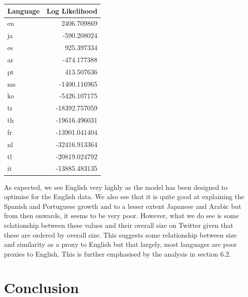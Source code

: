 \documentclass[12pt]{article}
\begin{document}
\begin{table}[hbtp]
\begin{center}
\begin{tabular}{lr}
\toprule
 Language &  Log Likelihood \\
\midrule
       en &     2406.709869 \\
       ja &     -590.208024 \\
       es &      925.397334 \\
       ar &     -474.177388 \\
       pt &      413.507636 \\
       ms &    -1400.116965 \\
       ko &    -5426.107175 \\
       tr &   -18392.757059 \\
       th &   -19616.496031 \\
       fr &   -13901.041404 \\
       nl &   -32416.913364 \\
       tl &   -20819.024792 \\
       it &   -13885.483135 \\
\bottomrule
\end{tabular}
\end{center}
\end{table}
\FloatBarrier
\vspace{0.5cm}
As expected, we see English very highly as the model has been designed to optimise for the English data. We also see that it is quite good at explaining the Spanish and Portuguese growth and to a lesser extent Japanese and Arabic but from then onwards, it seems to be very poor. However, what we do see is some relationship between these values and their overall size on Twitter given that these are ordered by overall size. This suggests some relationship between size and similarity as a proxy to English but that largely, most languages are poor proxies to English. This is further emphasised by the analysis in section 6.2.
\newpage
\section{Conclusion}
\end{document}
